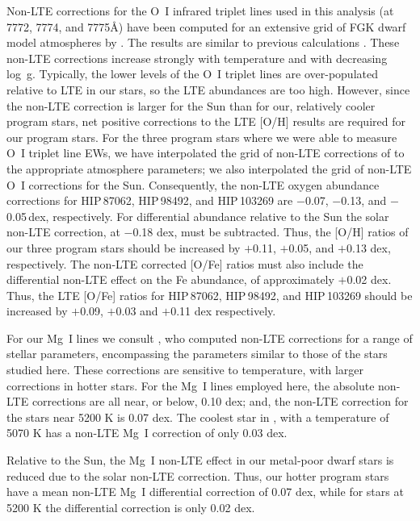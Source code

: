 \documentclass[revtex4]{emulateapj}
\begin{document}
Non-LTE corrections for the O~I infrared triplet lines used in this analysis (at 7772, 7774, and 7775\AA) have been computed for an extensive grid of FGK dwarf model atmospheres by \citet{Amarsi2016}.  The results are similar to previous calculations \citep[e.g.,][]{Fabb2009,Sitnova2013}.  These non-LTE corrections increase strongly with temperature and with decreasing log~g.  Typically, the lower levels of the O~I triplet lines are over-populated relative to LTE in our stars, so the LTE abundances are too high.  However, since the non-LTE correction is larger for the Sun than for our, relatively cooler program stars, net positive corrections to the LTE [O/H] results are required for our program stars.  For the three program stars where we were able to measure O~I triplet line EWs, we have interpolated the grid of non-LTE corrections of \citet{Amarsi2016} to the appropriate atmosphere parameters; we also interpolated the grid of non-LTE O~I corrections for the Sun.  Consequently, the non-LTE oxygen abundance corrections for HIP\,87062, HIP\,98492, and HIP\,103269 are $-$0.07, $-$0.13, and $-$0.05\,dex, respectively.  For differential abundance relative to the Sun the solar non-LTE correction, at $-$0.18 dex, must be subtracted.  Thus, the [O/H] ratios of our three program stars should be increased by $+$0.11, $+$0.05, and $+$0.13 dex, respectively.  The non-LTE corrected [O/Fe] ratios must also include the differential non-LTE effect on the Fe abundance, of approximately $+$0.02 dex.  Thus, the LTE [O/Fe] ratios for HIP\,87062, HIP\,98492, and HIP\,103269 should be increased by $+$0.09, $+$0.03 and $+$0.11 dex respectively.

For our Mg~I lines we consult \citet{ZG2000}, who computed non-LTE corrections for a range of stellar parameters, encompassing the parameters similar to those of the stars studied here.  These corrections are sensitive to temperature, with larger corrections in hotter stars.  For the Mg~I lines employed here, the \citet{ZG2000} absolute non-LTE corrections are all near, or below, 0.10 dex; and, the non-LTE correction for the stars near 5200 K is 0.07 dex.  The coolest star in \citet{Gehren2006}, with a temperature of 5070 K has a non-LTE Mg~I correction of only 0.03 dex.

Relative to the Sun, the Mg~I non-LTE effect in our metal-poor dwarf stars is reduced due to the solar non-LTE correction.  Thus, our hotter program stars have a mean non-LTE Mg~I differential correction of 0.07 dex, while for stars at 5200 K the differential correction is only 0.02 dex.
\end{document}
